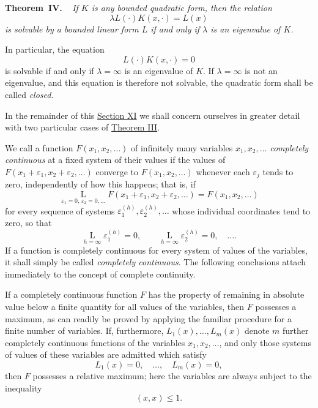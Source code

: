\documentclass[b5paper,twoside]{article}
\makeatletter
\newcommand{\hilbertstatementname}[2]{%
  \textbf{#1\if\relax\detokenize{#2}\relax\else\ #2\fi.}%
}
\newenvironment{theorem}[1][]{%
  \par\addvspace{.7\baselineskip}%
  \phantomsection
  \protected@edef\@currentlabel{#1}%
  \noindent\hilbertstatementname{Theorem}{#1}\ \itshape\ignorespaces
}{%
  \par\addvspace{.7\baselineskip}%
}
\newcommand{\originalpage}[1]{\phantomsection\label{origpage:#1}}
\makeatother
\begin{document}
\begin{theorem}[IV]\label{thm:IV}
If $K$ is any bounded quadratic form, then the relation
\[
  \lambda L(\mathord{\cdot})K(x,\mathord{\cdot})=L(x)
\]
is solvable by a bounded linear form $L$ if and only if $\lambda$ is an
eigenvalue of $K$.
\end{theorem}

In particular, the equation
\[
  L(\mathord{\cdot})K(x,\mathord{\cdot})=0
\]
is solvable if and only if $\lambda=\infty$ is an eigenvalue of $K$.  If
$\lambda=\infty$ is not an eigenvalue, and this equation is therefore not
solvable, the quadratic form shall be called \emph{closed}.

\originalpage{200}
In the remainder of this \hyperref[sec:XI]{Section XI} we shall concern
ourselves in greater detail with two particular cases of
\hyperref[thm:III]{Theorem III}.

We call a function $F(x_1,x_2,\ldots)$ of infinitely many variables
$x_1,x_2,\ldots$ \emph{completely continuous} at a fixed system of their
values if the values of $F(x_1+\varepsilon_1,x_2+\varepsilon_2,\ldots)$
converge to $F(x_1,x_2,\ldots)$ whenever each $\varepsilon_j$ tends to zero,
independently of how this happens; that is, if
\[
  \mathop{\mathrm{L}}\limits_{\varepsilon_1=0,\,
    \varepsilon_2=0,\ldots}
  F(x_1+\varepsilon_1,x_2+\varepsilon_2,\ldots)
  =F(x_1,x_2,\ldots)
\]
for every sequence of systems
$\varepsilon_1^{(h)},\varepsilon_2^{(h)},\ldots$ whose individual coordinates
tend to zero, so that
\[
  \mathop{\mathrm{L}}\limits_{h=\infty}\varepsilon_1^{(h)}=0,
  \qquad
  \mathop{\mathrm{L}}\limits_{h=\infty}\varepsilon_2^{(h)}=0,
  \quad\ldots.
\]
If a function is completely continuous for every system of values of the
variables, it shall simply be called \emph{completely continuous}.  The
following conclusions attach immediately to the concept of complete
continuity.

If a completely continuous function $F$ has the property of remaining in
absolute value below a finite quantity for all values of the variables, then
$F$ possesses a maximum, as can readily be proved by applying the familiar
procedure for a finite number of variables.  If, furthermore,
$L_1(x),\ldots,L_m(x)$ denote $m$ further completely continuous functions of
the variables $x_1,x_2,\ldots$, and only those systems of values of these
variables are admitted which satisfy
\[
  L_1(x)=0,\quad\ldots,\quad L_m(x)=0,
\]
then $F$ possesses a relative maximum; here the variables are always subject
to the inequality
\[
  (x,x)\le1.
\]
\end{document}
